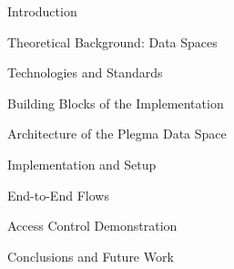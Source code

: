 \documentclass[12pt,a4paper]{report}
\begin{document}






\clearpage
{}

\begin{thesischapter}{Introduction}

\end{thesischapter}

\begin{thesischapter}{Theoretical Background: Data Spaces}

\end{thesischapter}

\begin{thesischapter}{Technologies and Standards}

\end{thesischapter}

\begin{thesischapter}{Building Blocks of the Implementation}

\end{thesischapter}

\begin{thesischapter}{Architecture of the Plegma Data Space}

\end{thesischapter}

\begin{thesischapter}{Implementation and Setup}

\end{thesischapter}

\begin{thesischapter}{End-to-End Flows}

\end{thesischapter}

\begin{thesischapter}{Access Control Demonstration}

\end{thesischapter}

\begin{thesischapter}{Conclusions and Future Work}

\end{thesischapter}

\appendix





\printbibliography
\end{document}
